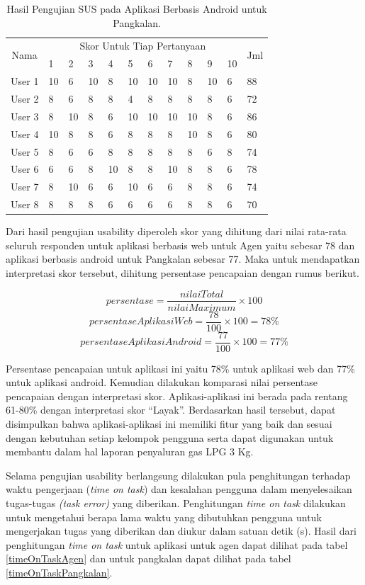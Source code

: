 \begin{table}[H]
	\center
	\caption{Hasil Pengujian SUS pada Aplikasi Berbasis Android untuk Pangkalan.}
	\label{hasilSusPangkalan}
	\begin{tabular}{|c|l|l|l|l|l|l|l|l|l|l|l|}
		\hline
		\multirow{2}{*}{Nama} & \multicolumn{10}{c|}{Skor Untuk Tiap Pertanyaan} &  \multirow{2}{0.5cm}{Jml} \\ \cline{2-11} 
		&1 &2  &3 &4 &5 &6 &7 &8 &9 &10& \\
		\hline
		User 1 &10 &6 &10 &8 &10 &10 &10 &8 &10 &6 &88 \\ 
		\hline
		User 2 &8 &6 &8 &8 &4 &8 &8 &8 &8 &6 &72 \\ 
		\hline
		User 3 &8 &10 &8 &6 &10 &10 &10 &10 &8 &6 &86 \\ 
		\hline
		User 4 &10 &8 &8 &6 &8 &8 &8 &10 &8 &6 &80 \\ 
		\hline
		User 5 &8 &6 &6 &8 &8 &8 &8 &8 &6 &8 &74 \\ 
		\hline
		User 6 &6 &6 &8 &10 &8 &8 &10 &8 &8 &6 &78 \\ 
		\hline
		User 7 &8 &10 &6 &6 &10 &6 &6 &8 &8 &6 &74 \\ 
		\hline
		User 8 &8 &8 &8 &6 &6 &6 &6 &8 &8 &6 &70 \\ 
		\hline
	\end{tabular}
\end{table}

Dari hasil pengujian usability diperoleh skor yang dihitung dari nilai rata-rata seluruh responden untuk aplikasi berbasis web untuk Agen yaitu sebesar 78 dan aplikasi berbasis android untuk Pangkalan sebesar 77. Maka untuk mendapatkan interpretasi skor tersebut, dihitung persentase pencapaian dengan rumus berikut. 

\[persentase = \frac{nilai Total}{nilai Maximum}\times100\]
\[persentase Aplikasi Web = \frac{78}{100}\times100=78\%\]
\[persentase Aplikasi Android = \frac{77}{100}\times100=77\%\]

Persentase pencapaian untuk aplikasi ini yaitu 78\% untuk aplikasi web dan 77\% untuk aplikasi android. Kemudian dilakukan komparasi nilai persentase pencapaian dengan interpretasi skor. Aplikasi-aplikasi ini berada pada rentang 61-80\% dengan interpretasi skor “Layak”. Berdasarkan hasil tersebut, dapat disimpulkan bahwa aplikasi-aplikasi ini memiliki fitur yang baik dan sesuai dengan kebutuhan setiap kelompok pengguna serta dapat digunakan untuk membantu dalam hal laporan penyaluran gas LPG 3 Kg.  

Selama pengujian usability berlangsung dilakukan pula penghitungan terhadap waktu pengerjaan (\textit{time on task}) dan kesalahan pengguna dalam menyelesaikan tugas-tugas \textit{(task error)} yang diberikan. Penghitungan\textit{ \textit{time on task}} dilakukan untuk mengetahui berapa lama waktu yang dibutuhkan pengguna untuk mengerjakan tugas yang diberikan dan diukur dalam satuan detik (s). Hasil dari penghitungan \textit{time on task} untuk aplikasi untuk agen dapat dilihat pada tabel \ref{timeOnTaskAgen} dan untuk pangkalan dapat dilihat pada tabel \ref{timeOnTaskPangkalan}. 


